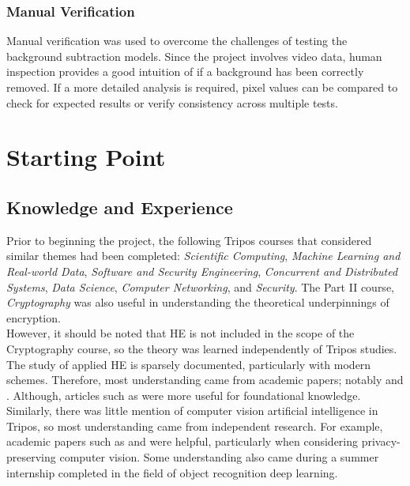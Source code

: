 \setlength{\leftskip}{0cm}
\subsubsection{Manual Verification}
\setlength{\leftskip}{0.5cm}
\indent \indent
Manual verification was used to overcome the challenges of testing the background subtraction models. Since the project involves video data, human inspection provides a good intuition of if a background has been correctly removed. If a more detailed analysis is required, pixel values can be compared to check for expected results or verify consistency across multiple tests.

\setlength{\leftskip}{0cm}





\section{Starting Point}
\label{sec:startingPoint}

\subsection{Knowledge and Experience}
\setlength{\leftskip}{0.5cm}
\indent \indent
Prior to beginning the project, the following Tripos courses that considered similar themes had been completed: \textit{Scientific Computing}, \textit{Machine Learning and Real-world Data}, \textit{Software and Security Engineering}, \textit{Concurrent and Distributed Systems}, \textit{Data Science}, \textit{Computer Networking}, and \textit{Security}. The Part II course, \textit{Cryptography} was also useful in understanding the theoretical underpinnings of encryption.
\smallskip \\ \indent
However, it should be noted that HE is not included in the scope of the Cryptography course, so the theory was learned independently of Tripos studies. The study of applied HE is sparsely documented, particularly with modern schemes. Therefore, most understanding came from academic papers; notably \cite{CKKS} and \cite{SEAL}. Although, articles such as \cite{BrilliantHE} were more useful for foundational knowledge.
\smallskip \\ \indent
Similarly, there was little mention of computer vision artificial intelligence in Tripos, so most understanding came from independent research. For example, academic papers such as \cite{Stauffer} and \cite{Kulchandani} were helpful, particularly when considering privacy-preserving computer vision. Some understanding also came during a summer internship completed in the field of object recognition deep learning.

